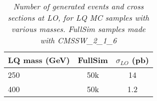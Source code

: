 
%
\begin{table}[htb]
  \label{tab:NumEvents}
  \begin{center}
    \begin{tabular}{|l|cc|} \hline
      LQ mass (GeV) & FullSim &  $\sigma_{LO}$ (pb) \\ \hline
      250  & 50k  & 14 \\
      400  & 50k  & 1.2 \\
       \hline
    \end{tabular}
    \caption{\small \sl Number of generated events and cross sections at LO, for LQ MC samples with various masses.  
      FullSim samples made with CMSSW\_2\_1\_6 }
  \end{center}
\end{table}

